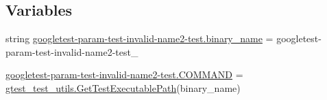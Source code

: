 \subsection*{Variables}
\begin{DoxyCompactItemize}
\item 
string \mbox{\hyperlink{namespacegoogletest-param-test-invalid-name2-test_a0e26891aaf72a6f04a60811b05a83e81}{googletest-\/param-\/test-\/invalid-\/name2-\/test.\+binary\+\_\+name}} = \textquotesingle{}googletest-\/param-\/test-\/invalid-\/name2-\/test\+\_\+\textquotesingle{}
\item 
\mbox{\hyperlink{namespacegoogletest-param-test-invalid-name2-test_ac9395338e8bff8c30835e578658394e3}{googletest-\/param-\/test-\/invalid-\/name2-\/test.\+C\+O\+M\+M\+A\+ND}} = \mbox{\hyperlink{namespacegtest__test__utils_a89ed3717984a80ffbb7a9c92f71b86a2}{gtest\+\_\+test\+\_\+utils.\+Get\+Test\+Executable\+Path}}(binary\+\_\+name)
\end{DoxyCompactItemize}
